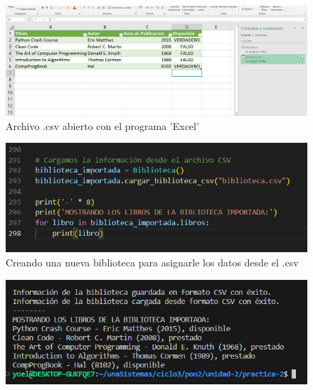 \documentclass[11pt,a4paper]{article}
\begin{document}
\begin{figure}[H]
    \centering
    \includegraphics[width=1\linewidth]{images/10-5.png}
    \caption{Archivo .csv abierto con el programa 'Excel'}
    \label{fig:enter-label}
\end{figure}

\begin{figure}[H]
    \centering
    \includegraphics[width=1\linewidth]{images/10-6.png}
    \caption{Creando una nueva biblioteca para asignarle los datos desde el .csv}
    \label{fig:enter-label}
\end{figure}

\begin{figure}[H]
    \centering
    \includegraphics[width=1\linewidth]{images/10-7.png}
    \caption{}
    \label{fig:enter-label}
\end{figure}
\end{document}
